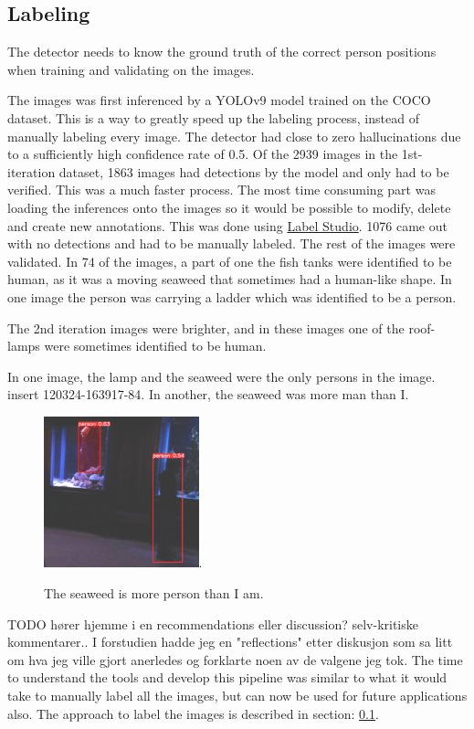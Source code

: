 \subsection{Labeling}
\label{sec:labeling}
The detector needs to know the ground truth of the correct person positions when training and validating on the images. 

The images was first inferenced by a YOLOv9 model trained on the COCO dataset. This is a way to greatly speed up the labeling process, instead of manually labeling every image. The detector had close to zero hallucinations due to a sufficiently high confidence rate of 0.5. Of the 2939 images in the 1st-iteration dataset, 1863 images had detections by the model and only had to be verified. This was a much faster process. The most time consuming part was loading the inferences onto the images so it would be possible to modify, delete and create new annotations. This was done using \href{}{Label Studio}. 1076 came out with no detections and had to be manually labeled. The rest of the images were validated. In 74 of the images, a part of one the fish tanks were identified to be human, as it was a moving seaweed that sometimes had a human-like shape. In one image the person was carrying a ladder which was identified to be a person. 

The 2nd iteration images were brighter, and in these images one of the roof-lamps were sometimes identified to be human.

In one image, the lamp and the seaweed were the only persons in the image. insert 120324-163917-84. 
In another, the seaweed was more man than I. 

\begin{figure}
    \centering
    \includegraphics[width=0.4\textwidth]{Images/Fun/seaweed-man-more-than-I.png}.
    \caption{The seaweed is more person than I am.}
\end{figure}

TODO hører hjemme i en recommendations eller discussion? selv-kritiske kommentarer.. I forstudien hadde jeg en "reflections" etter diskusjon som sa litt om hva jeg ville gjort anerledes og forklarte noen av de valgene jeg tok. 
The time to understand the tools and develop this pipeline was similar to what it would take to manually label all the images, but can now be used for future applications also. The approach to label the images is described in section: \ref{sec:labeling}.

